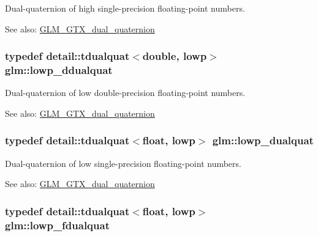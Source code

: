 Dual-quaternion of high single-precision floating-point numbers.

\begin{Desc}
\item[See also:]\hyperlink{group__gtc__dual__quaternion}{GLM\_\-GTX\_\-dual\_\-quaternion} \end{Desc}
\hypertarget{group__gtc__dual__quaternion_g29461fddd543ffdf65a199fc28c42458}{
\subsubsection[lowp\_\-ddualquat]{\setlength{\rightskip}{0pt plus 5cm}typedef detail::tdualquat$<$double, lowp$>$ {\bf glm::lowp\_\-ddualquat}}}
\label{group__gtc__dual__quaternion_g29461fddd543ffdf65a199fc28c42458}


Dual-quaternion of low double-precision floating-point numbers.

\begin{Desc}
\item[See also:]\hyperlink{group__gtc__dual__quaternion}{GLM\_\-GTX\_\-dual\_\-quaternion} \end{Desc}
\hypertarget{group__gtc__dual__quaternion_ge1772179edc60f4e8b46c8772eeeccee}{
\subsubsection[lowp\_\-dualquat]{\setlength{\rightskip}{0pt plus 5cm}typedef detail::tdualquat$<$float, lowp$>$ {\bf glm::lowp\_\-dualquat}}}
\label{group__gtc__dual__quaternion_ge1772179edc60f4e8b46c8772eeeccee}


Dual-quaternion of low single-precision floating-point numbers.

\begin{Desc}
\item[See also:]\hyperlink{group__gtc__dual__quaternion}{GLM\_\-GTX\_\-dual\_\-quaternion} \end{Desc}
\hypertarget{group__gtc__dual__quaternion_ge62c636c63c9eb3c1ea6d10f4b7d7c81}{
\subsubsection[lowp\_\-fdualquat]{\setlength{\rightskip}{0pt plus 5cm}typedef detail::tdualquat$<$float, lowp$>$ {\bf glm::lowp\_\-fdualquat}}}
\label{group__gtc__dual__quaternion_ge62c636c63c9eb3c1ea6d10f4b7d7c81}


